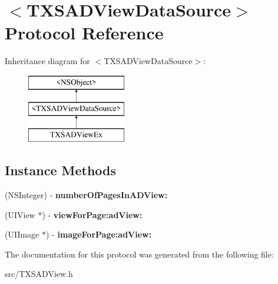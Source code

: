 \hypertarget{protocol_t_x_s_a_d_view_data_source-p}{}\section{$<$T\+X\+S\+A\+D\+View\+Data\+Source$>$ Protocol Reference}
\label{protocol_t_x_s_a_d_view_data_source-p}
Inheritance diagram for $<$T\+X\+S\+A\+D\+View\+Data\+Source$>$\+:\begin{figure}[H]
\begin{center}
\leavevmode
\includegraphics[height=3.000000cm]{protocol_t_x_s_a_d_view_data_source-p}
\end{center}
\end{figure}
\subsection*{Instance Methods}
\begin{DoxyCompactItemize}
\item 
\hypertarget{protocol_t_x_s_a_d_view_data_source-p_a47bd746e15425765ad237ba9f2771e8f}{}(N\+S\+Integer) -\/ {\bfseries number\+Of\+Pages\+In\+A\+D\+View\+:}\label{protocol_t_x_s_a_d_view_data_source-p_a47bd746e15425765ad237ba9f2771e8f}

\item 
\hypertarget{protocol_t_x_s_a_d_view_data_source-p_aff2958b7adcf973732d99cdcc2d9451b}{}(U\+I\+View $\ast$) -\/ {\bfseries view\+For\+Page\+:ad\+View\+:}\label{protocol_t_x_s_a_d_view_data_source-p_aff2958b7adcf973732d99cdcc2d9451b}

\item 
\hypertarget{protocol_t_x_s_a_d_view_data_source-p_af1d8537eec22835d5405f99fe6f4221d}{}(U\+I\+Image $\ast$) -\/ {\bfseries image\+For\+Page\+:ad\+View\+:}\label{protocol_t_x_s_a_d_view_data_source-p_af1d8537eec22835d5405f99fe6f4221d}

\end{DoxyCompactItemize}


The documentation for this protocol was generated from the following file\+:\begin{DoxyCompactItemize}
\item 
src/T\+X\+S\+A\+D\+View.\+h\end{DoxyCompactItemize}
